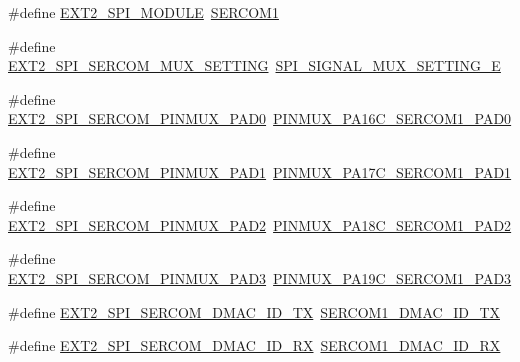 \begin{DoxyCompactItemize}
\item 
\#define \mbox{\hyperlink{group__samd21__xplained__pro__features__group_ga61fcf212ea571b4b7570423bb3ad23ba}{E\+X\+T2\+\_\+\+S\+P\+I\+\_\+\+M\+O\+D\+U\+LE}}~\mbox{\hyperlink{group___s_a_m_d21_j18_a__base_ga130d7d7bc9ef1da1ba1bd094b42449d7}{S\+E\+R\+C\+O\+M1}}
\item 
\#define \mbox{\hyperlink{group__samd21__xplained__pro__features__group_gaba3b1b2adf5294f49f0729e557139b48}{E\+X\+T2\+\_\+\+S\+P\+I\+\_\+\+S\+E\+R\+C\+O\+M\+\_\+\+M\+U\+X\+\_\+\+S\+E\+T\+T\+I\+NG}}~\mbox{\hyperlink{group__asfdoc__sam0__sercom__spi__group_gga420e19efe4a923eb9ab6dc619a23c370a7234b3f4e0aa7fe723cc85edabea9816}{S\+P\+I\+\_\+\+S\+I\+G\+N\+A\+L\+\_\+\+M\+U\+X\+\_\+\+S\+E\+T\+T\+I\+N\+G\+\_\+E}}
\item 
\#define \mbox{\hyperlink{group__samd21__xplained__pro__features__group_ga6e34e325818f6d4e8227c8ee7220a5fa}{E\+X\+T2\+\_\+\+S\+P\+I\+\_\+\+S\+E\+R\+C\+O\+M\+\_\+\+P\+I\+N\+M\+U\+X\+\_\+\+P\+A\+D0}}~\mbox{\hyperlink{pio_2samd21j18a_8h_a4ad061fad9fa2c90b4930fc7a437b61c}{P\+I\+N\+M\+U\+X\+\_\+\+P\+A16\+C\+\_\+\+S\+E\+R\+C\+O\+M1\+\_\+\+P\+A\+D0}}
\item 
\#define \mbox{\hyperlink{group__samd21__xplained__pro__features__group_ga4adc397a5b4274c6d63a37dd82073b86}{E\+X\+T2\+\_\+\+S\+P\+I\+\_\+\+S\+E\+R\+C\+O\+M\+\_\+\+P\+I\+N\+M\+U\+X\+\_\+\+P\+A\+D1}}~\mbox{\hyperlink{pio_2samd21j18a_8h_afb9b85de68d63dec32ee0caeb2bf826b}{P\+I\+N\+M\+U\+X\+\_\+\+P\+A17\+C\+\_\+\+S\+E\+R\+C\+O\+M1\+\_\+\+P\+A\+D1}}
\item 
\#define \mbox{\hyperlink{group__samd21__xplained__pro__features__group_ga80742baa0460438ed9dfc52ed4cc875c}{E\+X\+T2\+\_\+\+S\+P\+I\+\_\+\+S\+E\+R\+C\+O\+M\+\_\+\+P\+I\+N\+M\+U\+X\+\_\+\+P\+A\+D2}}~\mbox{\hyperlink{pio_2samd21j18a_8h_a84a8bfa73b3db83978c6fcd7d3ed214d}{P\+I\+N\+M\+U\+X\+\_\+\+P\+A18\+C\+\_\+\+S\+E\+R\+C\+O\+M1\+\_\+\+P\+A\+D2}}
\item 
\#define \mbox{\hyperlink{group__samd21__xplained__pro__features__group_ga64c0756fb7fe251282040ab588f85a22}{E\+X\+T2\+\_\+\+S\+P\+I\+\_\+\+S\+E\+R\+C\+O\+M\+\_\+\+P\+I\+N\+M\+U\+X\+\_\+\+P\+A\+D3}}~\mbox{\hyperlink{pio_2samd21j18a_8h_a22b3034c9e13388c4194905594c0b52a}{P\+I\+N\+M\+U\+X\+\_\+\+P\+A19\+C\+\_\+\+S\+E\+R\+C\+O\+M1\+\_\+\+P\+A\+D3}}
\item 
\#define \mbox{\hyperlink{group__samd21__xplained__pro__features__group_gae51875d4b3e7f052c4c890f1d7f17e77}{E\+X\+T2\+\_\+\+S\+P\+I\+\_\+\+S\+E\+R\+C\+O\+M\+\_\+\+D\+M\+A\+C\+\_\+\+I\+D\+\_\+\+TX}}~\mbox{\hyperlink{sercom1_8h_acb019d23314c2c31c719d1a42365fcf3}{S\+E\+R\+C\+O\+M1\+\_\+\+D\+M\+A\+C\+\_\+\+I\+D\+\_\+\+TX}}
\item 
\#define \mbox{\hyperlink{group__samd21__xplained__pro__features__group_gabb9be2528657d27487091c865dfc956f}{E\+X\+T2\+\_\+\+S\+P\+I\+\_\+\+S\+E\+R\+C\+O\+M\+\_\+\+D\+M\+A\+C\+\_\+\+I\+D\+\_\+\+RX}}~\mbox{\hyperlink{sercom1_8h_afbc2d8e28643a3c810fc5f0dbaf56604}{S\+E\+R\+C\+O\+M1\+\_\+\+D\+M\+A\+C\+\_\+\+I\+D\+\_\+\+RX}}
\end{DoxyCompactItemize}
